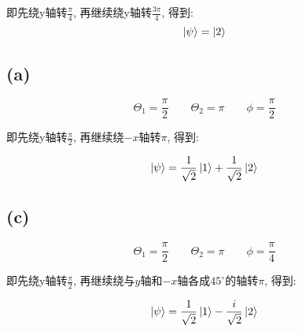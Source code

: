 \documentclass[twoside]{article}
\begin{document}
即先绕y轴转$\frac{\pi}{4}$, 再继续绕y轴转$\frac{3\pi}{4}$, 得到:
$$\ket{\psi} = \ket{2}$$

\subsection*{(a)}

$$\Theta_1 = \frac{\pi}{2} \qquad \Theta_2 = \pi \qquad \phi = \frac{\pi}{2}$$

即先绕y轴转$\frac{\pi}{2}$, 再继续绕$-x$轴转$\pi$, 得到:

$$\ket{\psi} = \frac{1}{\sqrt{2}}\ket{1} + \frac{1}{\sqrt{2}}\ket{2}$$

\subsection*{(c)}

$$\Theta_1 = \frac{\pi}{2} \qquad \Theta_2 = \pi \qquad \phi = \frac{\pi}{4}$$

即先绕y轴转$\frac{\pi}{2}$, 再继续绕与$y$轴和$-x$轴各成$45^\circ$的轴转$\pi$, 得到:

$$\ket{\psi} = \frac{1}{\sqrt{2}}\ket{1} - \frac{i}{\sqrt{2}}\ket{2}$$



\end{document}
